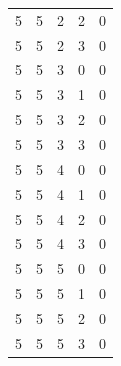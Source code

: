 \begin{longtable}{rrrrr}
5 & 5 & 2 & 2 & 0 \\
5 & 5 & 2 & 3 & 0 \\
5 & 5 & 3 & 0 & 0 \\
5 & 5 & 3 & 1 & 0 \\
5 & 5 & 3 & 2 & 0 \\
5 & 5 & 3 & 3 & 0 \\
5 & 5 & 4 & 0 & 0 \\
5 & 5 & 4 & 1 & 0 \\
5 & 5 & 4 & 2 & 0 \\
5 & 5 & 4 & 3 & 0 \\
5 & 5 & 5 & 0 & 0 \\
5 & 5 & 5 & 1 & 0 \\
5 & 5 & 5 & 2 & 0 \\
5 & 5 & 5 & 3 & 0 \\
\end{longtable}
